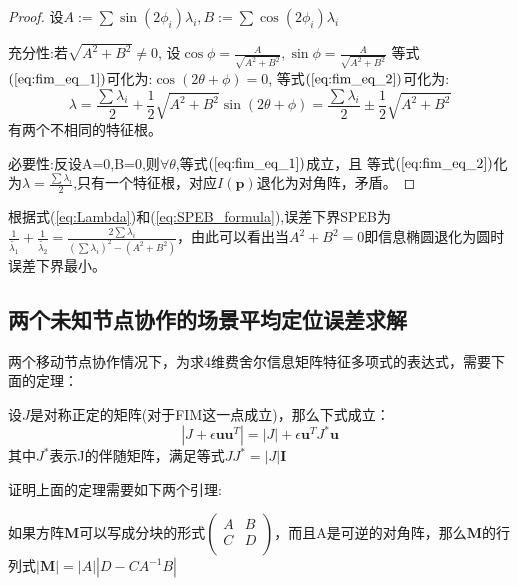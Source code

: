 \begin{proof}
设$A:=\sum\sin(2\phi_i)\lambda_i,B:=\sum\cos(2\phi_i)\lambda_i$

充分性:若$\sqrt{A^2+B^2} \neq 0$,
设$\cos\phi=\frac{A}{\sqrt{A^2+B^2}},\sin\phi=\frac{A}{\sqrt{A^2+B^2}}$
等式$(\ref{eq:fim_eq_1})$可化为:$\cos(2\theta+\phi)=0$,
等式$(\ref{eq:fim_eq_2})$可化为:
\begin{equation}\label{eq:Lambda}
\lambda=\frac{\sum \lambda_i}{2}+\frac{1}{2}\sqrt{A^2+B^2}\sin(2\theta+\phi)=\frac{\sum \lambda_i}{2}\pm\frac{1}{2}\sqrt{A^2+B^2}
\end{equation}
有两个不相同的特征根。

必要性:反设A=0,B=0,则$\forall \theta$,等式$(\ref{eq:fim_eq_1})$成立，且
等式$(\ref{eq:fim_eq_2})$化为$\lambda=\frac{\sum \lambda_i}{2}$,只有一个特征根，对应$I(\bm{p})$退化为对角阵，矛盾。
\end{proof}
根据式(\ref{eq:Lambda})和(\ref{eq:SPEB_formula}),误差下界SPEB为$\frac{1}{\tilde{\lambda_1}}+\frac{1}{\tilde{\lambda_2}}=\frac{2\sum \lambda_i}{(\sum \lambda_i)^2-(A^2+B^2)}$，由此可以看出当$A^2+B^2=0$即信息椭圆退化为圆时误差下界最小。

\subsection{两个未知节点协作的场景平均定位误差求解}\label{subsection:two_node_cooperation}

两个移动节点协作情况下，为求4维费舍尔信息矩阵特征多项式的表达式，需要下面的定理：
\begin{theorem}\label{thm:ShenIden}
设$J$是对称正定的矩阵(对于FIM这一点成立)，那么下式成立：
\begin{equation}\label{eq:ShenIden}
|J+\epsilon \bm{u}\bm{u}^T|=|J|+\epsilon \bm{u}^TJ^*\bm{u}
\end{equation}
其中$J^*$表示J的伴随矩阵，满足等式$JJ^*=|J|\bm{I}$
\end{theorem}
证明上面的定理需要如下两个引理:
\begin{lemma}\label{lemma:block}
如果方阵$\bm{M}$可以写成分块的形式$\left(\begin{array}{cc}
A&B\\
C&D\\
\end{array}\right)$，而且A是可逆的对角阵，那么$\bm{M}$的行列式$|\bm{M}|=|A||D-CA^{-1}B|$
\end{lemma}


